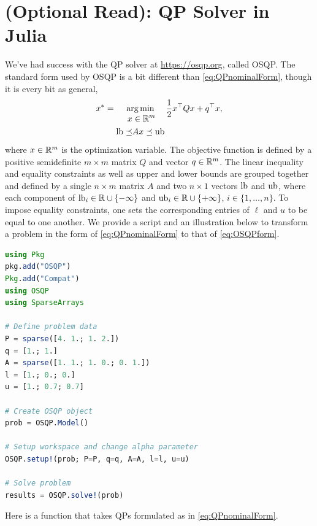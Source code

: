 \section{(Optional Read): QP Solver in Julia}
\label{sec:QpSolverJulia}
We've had success with the QP solver at \url{https://osqp.org}, called OSQP. The standard form used by OSQP is a bit different than \eqref{eq:QPnominalForm}, though it is every bit as general,
\begin{equation}
    \label{eq:OSQPform}
        x^\ast = \operatorname*{arg\,min}_{
        \begin{aligned} x &\in \mathbb R^m \\
    {\rm lb} \preceq &A x  \preceq {\rm ub} \\
      \end{aligned}
     } \frac{1}{2} x^\top Q x + q^\top x,
\end{equation}
where $x\in \mathbb R^m$ is the optimization variable. The objective function is defined by a positive semidefinite $m \times m$ matrix $Q$ and vector $q \in \mathbb R^m$. The linear inequality and equality constraints as well as upper and lower bounds are grouped together and defined by a single $n \times m$ matrix $A$ and two $n \times 1$ vectors ${\rm lb}$  and ${\rm ub}$, where each component of ${\rm lb}_i \in \mathbb R \cup \{ - \infty \}$ and  ${\rm ub}_i \in \mathbb R \cup \{ + \infty \}$,  $i\in \{1, \ldots, n\}$. To impose equality constraints, one sets the corresponding entries of $\ell$ and $u$ to be equal to one another. We provide a script and an illustration below to transform a problem in the form of \eqref{eq:QPnominalForm} to that of \eqref{eq:OSQPform}.


\begin{lstlisting}[language=Julia,style=mystyle]
using Pkg
pkg.add("OSQP")
Pkg.add("Compat")
using OSQP
using SparseArrays

# Define problem data
P = sparse([4. 1.; 1. 2.])
q = [1.; 1.]
A = sparse([1. 1.; 1. 0.; 0. 1.])
l = [1.; 0.; 0.]
u = [1.; 0.7; 0.7]

# Create OSQP object
prob = OSQP.Model()

# Setup workspace and change alpha parameter
OSQP.setup!(prob; P=P, q=q, A=A, l=l, u=u)

# Solve problem
results = OSQP.solve!(prob)
\end{lstlisting}

Here is a function that takes QPs formulated as in \eqref{eq:QPnominalForm}.

